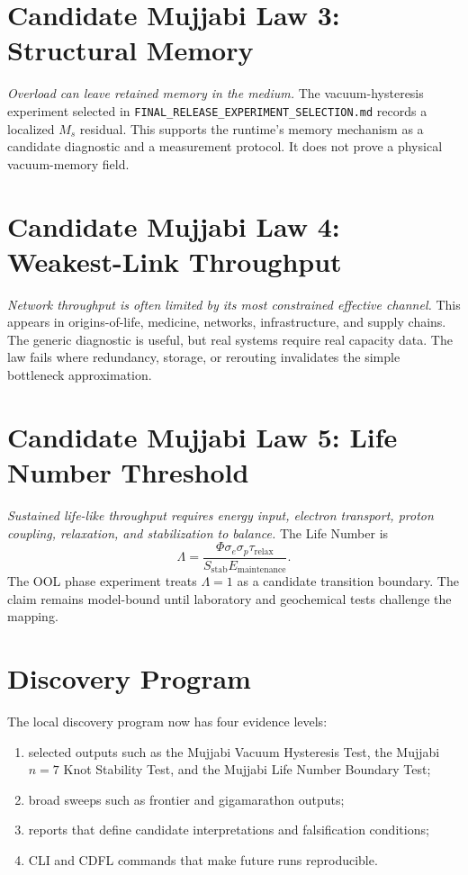 \documentclass[12pt,a4paper]{article}
\begin{document}
\section{Candidate Mujjabi Law 3: Structural Memory}
\textit{Overload can leave retained memory in the medium.}
The vacuum-hysteresis experiment selected in
\texttt{FINAL\_RELEASE\_EXPERIMENT\_SELECTION.md} records a localized $M_s$
residual. This supports the runtime's memory mechanism as a candidate diagnostic
and a measurement protocol. It does not prove a physical vacuum-memory field.

\section{Candidate Mujjabi Law 4: Weakest-Link Throughput}
\textit{Network throughput is often limited by its most constrained effective
channel.}
This appears in origins-of-life, medicine, networks, infrastructure, and supply
chains. The generic diagnostic is useful, but real systems require real capacity
data. The law fails where redundancy, storage, or rerouting invalidates the
simple bottleneck approximation.

\section{Candidate Mujjabi Law 5: Life Number Threshold}
\textit{Sustained life-like throughput requires energy input, electron
transport, proton coupling, relaxation, and stabilization to balance.}
The Life Number is
\begin{equation}
    \Lambda =
    \frac{\Phi \sigma_e \sigma_p \tau_{\mathrm{relax}}}
    {S_{\mathrm{stab}}E_{\mathrm{maintenance}}}.
\end{equation}
The OOL phase experiment treats $\Lambda=1$ as a candidate transition boundary.
The claim remains model-bound until laboratory and geochemical tests challenge
the mapping.

\section{Discovery Program}
The local discovery program now has four evidence levels:
\begin{enumerate}
    \item selected outputs such as the Mujjabi Vacuum Hysteresis Test, the
    Mujjabi \(n=7\) Knot Stability Test, and the Mujjabi Life Number Boundary
    Test;
    \item broad sweeps such as frontier and gigamarathon outputs;
    \item reports that define candidate interpretations and falsification
    conditions;
    \item CLI and CDFL commands that make future runs reproducible.
\end{enumerate}
\end{document}
